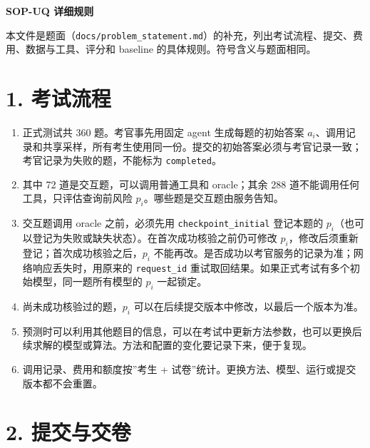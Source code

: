 \documentclass[11pt,a4paper]{article}
\providecommand{\tightlist}{\setlength{\itemsep}{3pt}\setlength{\parskip}{0pt}}
\begin{document}
\begin{center}\fontsize{15}{20}\selectfont\bfseries SOP-UQ 详细规则\end{center}
\vspace{2pt}
本文件是题面（\texttt{docs/problem\_statement.md}）的补充，列出考试流程、提交、费用、数据与工具、评分和
baseline 的具体规则。符号含义与题面相同。

\section{1. 考试流程}\label{ux8003ux8bd5ux6d41ux7a0b}

\begin{enumerate}
\def\labelenumi{\arabic{enumi}.}
\tightlist
\item
  正式测试共 360 题。考官事先用固定 agent 生成每题的初始答案
  \(a_i\)、调用记录和共享采样，所有考生使用同一份。提交的初始答案必须与考官记录一致；考官记录为失败的题，不能标为
  \texttt{completed}。
\item
  其中 72 道是交互题，可以调用普通工具和 oracle；其余 288
  道不能调用任何工具，只评估查询前风险
  \(p_i\)。哪些题是交互题由服务告知。
\item
  交互题调用 oracle 之前，必须先用 \texttt{checkpoint\_initial}
  登记本题的
  \(p_i\)（也可以登记为失败或缺失状态）。在首次成功核验之前仍可修改
  \(p_i\)，修改后须重新登记；首次成功核验之后，\(p_i\)
  不能再改。是否成功以考官服务的记录为准；网络响应丢失时，用原来的
  \texttt{request\_id}
  重试取回结果。如果正式考试有多个初始模型，同一题所有模型的 \(p_i\)
  一起锁定。
\item
  尚未成功核验过的题，\(p_i\)
  可以在后续提交版本中修改，以最后一个版本为准。
\item
  预测时可以利用其他题目的信息，可以在考试中更新方法参数，也可以更换后续求解的模型或算法。方法和配置的变化要记录下来，便于复现。
\item
  调用记录、费用和额度按''考生 +
  试卷''统计。更换方法、模型、运行或提交版本都不会重置。
\end{enumerate}

\section{2. 提交与交卷}\label{ux63d0ux4ea4ux4e0eux4ea4ux5377}
\end{document}
